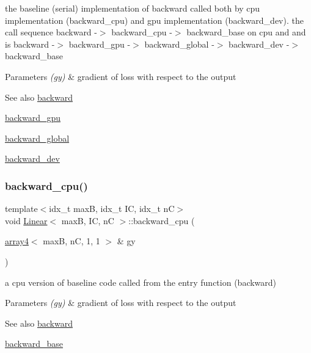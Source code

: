 the baseline (serial) implementation of backward called both by cpu implementation (backward\+\_\+cpu) and gpu implementation (backward\+\_\+dev). the call sequence backward -\/$>$ backward\+\_\+cpu -\/$>$ backward\+\_\+base on cpu and and is backward -\/$>$ backward\+\_\+gpu -\/$>$ backward\+\_\+global -\/$>$ backward\+\_\+dev -\/$>$ backward\+\_\+base 


\begin{DoxyParams}{Parameters}
{\em (gy)} & gradient of loss with respect to the output \\
\hline
\end{DoxyParams}
\begin{DoxySeeAlso}{See also}
\hyperlink{structLinear_aeaa39d38b876fbd70794621955193fd3}{backward} 

\hyperlink{structLinear_acc4936542d24da1357c1c7fb7f95d6ea}{backward\+\_\+gpu} 

\hyperlink{softmaxcrossentropy_8h_a47d56a9a23e08247b227f4aac17413e0}{backward\+\_\+global} 

\hyperlink{structLinear_a865f8dedc402675cd5cf240fcfbcd258}{backward\+\_\+dev} 
\end{DoxySeeAlso}
\mbox{\label{structLinear_acd4bd03ccec0da8849c2536d32770a61}} 
\subsubsection{\texorpdfstring{backward\+\_\+cpu()}{backward\_cpu()}}
{\footnotesize\ttfamily template$<$idx\+\_\+t maxB, idx\+\_\+t IC, idx\+\_\+t nC$>$ \\
void \hyperlink{structLinear}{Linear}$<$ maxB, IC, nC $>$\+::backward\+\_\+cpu (\begin{DoxyParamCaption}\item[{\hyperlink{structarray4}{array4}$<$ maxB, nC, 1, 1 $>$ \&}]{gy }\end{DoxyParamCaption})\hspace{0.3cm}{\ttfamily [inline]}}



a cpu version of baseline code called from the entry function (backward) 


\begin{DoxyParams}{Parameters}
{\em (gy)} & gradient of loss with respect to the output \\
\hline
\end{DoxyParams}
\begin{DoxySeeAlso}{See also}
\hyperlink{structLinear_aeaa39d38b876fbd70794621955193fd3}{backward} 

\hyperlink{structLinear_adcabfb5486aad2c05dd94bae98acf168}{backward\+\_\+base} 
\end{DoxySeeAlso}
\mbox{\label{structLinear_a865f8dedc402675cd5cf240fcfbcd258}} 
